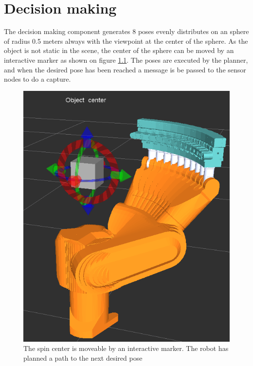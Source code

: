 \chapter{Decision making}
The decision making component generates 8 poses evenly distributes on an sphere of radius 0.5 meters always with the viewpoint at the center of the sphere. As the object is not static in the scene, the center of the sphere can be moved by an interactive marker as shown on figure \ref{fig:robot_moving_around_object}. The poses are executed by the planner, and when the desired pose has been reached a message is be passed to the sensor nodes to do a capture.


\begin{figure}[htb]
	\begin{center}
		\includegraphics[scale=0.5,trim=0 0 0 0]{graphics/04_decisionmaking/robot_moving_around_object.png}%
		\caption{The spin center is moveable by an interactive marker. The robot has planned a path to the next desired pose}
		\label{fig:robot_moving_around_object}
	\end{center}
\end{figure}

